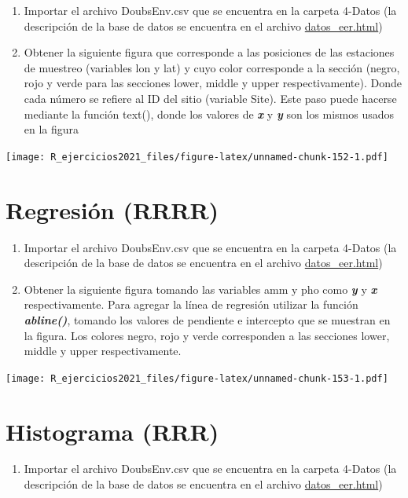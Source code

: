 \documentclass[]{book}
\providecommand{\tightlist}{%
  \setlength{\itemsep}{0pt}\setlength{\parskip}{0pt}}
\begin{document}
\begin{enumerate}
\def\labelenumi{\arabic{enumi}.}
\item
  Importar el archivo DoubsEnv.csv que se encuentra en la carpeta 4-Datos (la descripción de la base de datos se encuentra en el archivo \url{datos_eer.html})
\item
  Obtener la siguiente figura que corresponde a las posiciones de las estaciones de muestreo (variables lon y lat) y cuyo color corresponde a la sección (negro, rojo y verde para las secciones lower, middle y upper respectivamente). Donde cada número se refiere al ID del sitio (variable Site). Este paso puede hacerse mediante la función text(), donde los valores de \emph{\textbf{x}} y \emph{\textbf{y}} son los mismos usados en la figura
\end{enumerate}

\texttt{[image: R\_ejercicios2021\_files/figure-latex/unnamed-chunk-152-1.pdf]}

\hypertarget{regresiuxf3n-rrrr}{%
\section{Regresión (RRRR)}\label{regresiuxf3n-rrrr}}

\begin{enumerate}
\def\labelenumi{\arabic{enumi}.}
\item
  Importar el archivo DoubsEnv.csv que se encuentra en la carpeta 4-Datos (la descripción de la base de datos se encuentra en el archivo \url{datos_eer.html})
\item
  Obtener la siguiente figura tomando las variables amm y pho como \emph{\textbf{y}} y \emph{\textbf{x}} respectivamente. Para agregar la línea de regresión utilizar la función \emph{\textbf{abline()}}, tomando los valores de pendiente e intercepto que se muestran en la figura. Los colores negro, rojo y verde corresponden a las secciones lower, middle y upper respectivamente.
\end{enumerate}

\texttt{[image: R\_ejercicios2021\_files/figure-latex/unnamed-chunk-153-1.pdf]}

\hypertarget{histograma-rrr}{%
\section{Histograma (RRR)}\label{histograma-rrr}}

\begin{enumerate}
\def\labelenumi{\arabic{enumi}.}
\tightlist
\item
  Importar el archivo DoubsEnv.csv que se encuentra en la carpeta 4-Datos (la descripción de la base de datos se encuentra en el archivo \url{datos_eer.html})
\end{enumerate}
\end{document}
